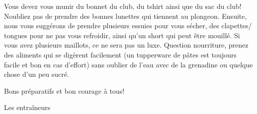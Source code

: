 \documentclass{article}
\begin{document}
\vspace{1cm}

Vous devez vous munir du bonnet du club, du tshirt ainsi que du sac du club!
Noubliez pas de prendre des bonnes lunettes qui tiennent au plongeon.
Ensuite, nous vous suggérons de prendre plusieurs essuies pour vous sécher, des clapettes/ tongues pour ne pas vous refroidir, ainsi qu’un short qui peut être mouillé. Si vous avez plusieurs maillots, ce ne sera pas un luxe.
Question nourriture, prenez des aliments qui se digèrent facilement (un tupperware de pâtes est toujours facile et bon en cas d’effort) sans oublier de l’eau avec de la grenadine ou quelque chose d’un peu sucré.

Bons préparatifs et bon courage à tous!

Les entraîneurs
\end{document}
